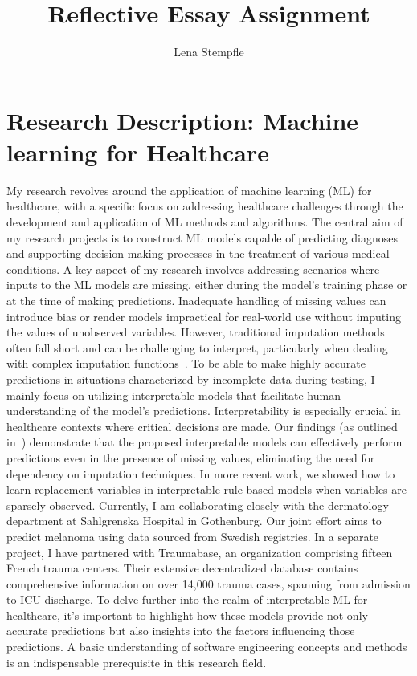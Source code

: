 \documentclass[11pt,runningheads]{article}
\begin{document}
\title{Reflective Essay Assignment}
\author{Lena Stempfle}
\maketitle


\section{Research Description: Machine learning for Healthcare}
My research revolves around the application of machine learning (ML) for healthcare, with a specific focus on addressing healthcare challenges through the development and application of ML methods and algorithms. The central aim of my research projects is to construct ML models capable of predicting diagnoses and supporting decision-making processes in the treatment of various medical conditions.
A key aspect of my research involves addressing scenarios where inputs to the ML models are missing, either during the model's training phase or at the time of making predictions. Inadequate handling of missing values can introduce bias or render models impractical for real-world use without imputing the values of unobserved variables. However, traditional imputation methods often fall short and can be challenging to interpret, particularly when dealing with complex imputation functions~\cite{rubin1976inference, rubin1996multiple}.
To be able to make highly accurate predictions in situations characterized by incomplete data during testing, I mainly focus on utilizing interpretable models that facilitate human understanding of the model's predictions. Interpretability is especially crucial in healthcare contexts where critical decisions are made. Our findings (as outlined in~\cite{stempfle2022sharing}) demonstrate that the proposed interpretable models can effectively perform predictions even in the presence of missing values, eliminating the need for dependency on imputation techniques. In more recent work, we showed how to learn replacement variables in interpretable rule-based models when variables are sparsely observed. 
Currently, I am collaborating closely with the dermatology department at Sahlgrenska Hospital in Gothenburg. Our joint effort aims to predict melanoma using data sourced from Swedish registries. In a separate project, I have partnered with Traumabase, an organization comprising fifteen French trauma centers. Their extensive decentralized database contains comprehensive information on over 14,000 trauma cases, spanning from admission to ICU discharge.
To delve further into the realm of interpretable ML for healthcare, it's important  to highlight how these models provide not only accurate predictions but also insights into the factors influencing those predictions. A basic understanding of software engineering concepts and methods is an indispensable prerequisite in this research field.
\end{document}
